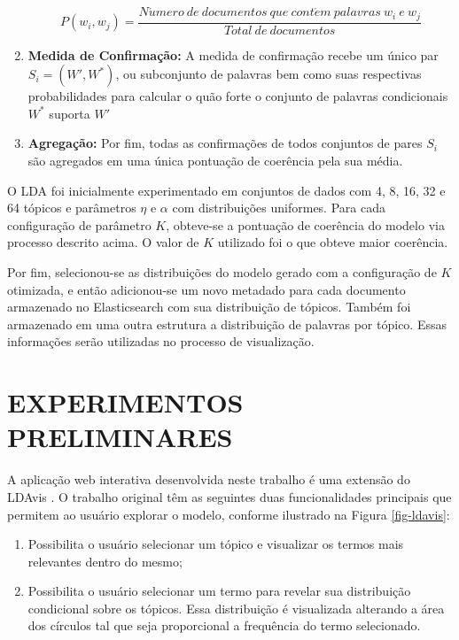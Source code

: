 \documentclass[12pt,a4paper]{article}
\begin{document}
\begin{enumerate}
\[P(w_i,w_j) = \frac{N\acute{u}mero\ de\ documentos\ que\ cont\acute{e}m\ palavras\ w_i\ e\ w_j}{Total\ de\ documentos}\]

\item \textbf{Medida de Confirmação:} A medida de confirmação recebe um único par $S_i = (W',W^*)$, ou subconjunto de palavras bem como suas respectivas probabilidades
 para calcular o quão forte o conjunto de palavras condicionais $W^*$ suporta $W'$

\item \textbf{Agregação:} Por fim, todas as confirmações de todos conjuntos de pares $S_i$ são agregados em uma única pontuação de coerência pela sua média.
\end{enumerate}

O LDA foi inicialmente experimentado em conjuntos de dados com 4, 8, 16, 32 e 64 tópicos e parâmetros $\eta$ e $\alpha$ com distribuições uniformes. Para cada configuração de parâmetro $K$,
 obteve-se a pontuação de coerência do modelo via processo descrito acima. O valor de $K$ utilizado foi o que obteve maior coerência.

Por fim, selecionou-se as distribuições do modelo gerado com a configuração de $K$ otimizada, e então adicionou-se um novo metadado para cada documento armazenado no Elasticsearch com sua distribuição de tópicos.
 Também foi armazenado em uma outra estrutura a distribuição de palavras por tópico. Essas informações serão utilizadas no processo de visualização.


\section{EXPERIMENTOS PRELIMINARES} \label{sec:experimentos}

A aplicação web interativa desenvolvida neste trabalho é uma extensão do LDAvis \cite{sievert2014ldavis}. O trabalho original têm as seguintes duas funcionalidades principais que permitem ao usuário explorar o modelo, conforme ilustrado na Figura \ref{fig-ldavis}:

\begin{enumerate}
  \item Possibilita o usuário selecionar um tópico e visualizar os termos mais relevantes dentro do mesmo;
  \item Possibilita o usuário selecionar um termo para revelar sua distribuição condicional sobre os tópicos. Essa distribuição
  é visualizada alterando a área dos círculos tal que seja proporcional a frequência do termo selecionado.
\end{enumerate}
\end{document}
